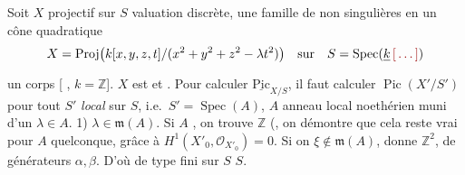 \documentclass[11pt,a4paper]{article}
\begin{document}
Soit $X$ \struck{\ill{}} projectif sur $S$  valuation discrète,  une famille de  non singulières  en un cône quadratique
\[
  X = \operatorname{Proj}\bigl(k[x, y, z, t]/(x^2 + y^2 + z^2 - \lambda t^2)\bigr)
  \quad \text{sur} \quad S = \operatorname{Spec}(\struck{k}\,\ill{})
\]
\struck{\ill{} \ill{}} \ill{} un corps [\ill{} \ill{} \ill{} \ill{} \ill{},    $k = \mathbb{Z}$]. $X$ est  et  .  Pour calculer $\underline{\mathrm{Pic}}_{X/S}$, il faut calculer $\operatorname{Pic}(X'/S')$ pour tout $S'$ \emph{local} sur $S$, i.e.\ $S' = \operatorname{Spec}(A)$, $A$ anneau local noethérien muni d'un $\lambda \in A$. \struck{\ill{}} 1) $\lambda \in \mathfrak{m}(A)$. Si $A$ \ill{} \ill{} \ill{}, on trouve $\mathbb{Z}$ (, on démontre que cela reste vrai pour $A$ quelconque, grâce à $\boxed{H^1(X'_0, \mathcal{O}_{X'_0}) = 0}$. Si on \ill{} \ill{} \ill{} $\xi \notin \mathfrak{m}(A)$, \ill{} \ill{} \ill{} donne \struck{\ill{}} $\mathbb{Z}^2$, de générateurs $\alpha, \beta$. D'où \struck{\ill{}}  \ill{} \ill{}  \ill{} de type fini sur $S$ \ill{} \ill{} $S$.

\end{document}
